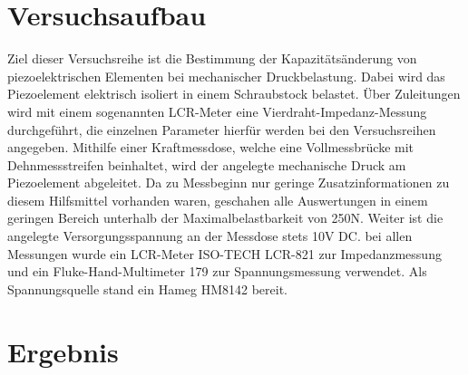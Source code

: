 \documentclass[12pt]{scrreprt} %
\begin{document}
\section{Versuchsaufbau}

Ziel dieser Versuchsreihe ist die Bestimmung der Kapazitätsänderung von piezoelektrischen Elementen bei mechanischer Druckbelastung. Dabei wird das Piezoelement elektrisch isoliert in einem Schraubstock belastet. Über Zuleitungen wird mit einem sogenannten LCR-Meter eine Vierdraht-Impedanz-Messung durchgeführt, die einzelnen Parameter hierfür werden bei den Versuchsreihen angegeben. Mithilfe einer Kraftmessdose, welche eine Vollmessbrücke mit Dehnmessstreifen beinhaltet, wird der angelegte mechanische Druck am Piezoelement abgeleitet. Da zu Messbeginn nur geringe Zusatzinformationen zu diesem Hilfsmittel vorhanden waren, geschahen alle Auswertungen in einem geringen Bereich unterhalb der Maximalbelastbarkeit von 250N. Weiter ist die angelegte Versorgungsspannung an der Messdose stets 10V DC. bei allen Messungen wurde ein LCR-Meter ISO-TECH LCR-821 zur Impedanzmessung und ein Fluke-Hand-Multimeter 179 zur Spannungsmessung verwendet. Als Spannungsquelle stand ein Hameg HM8142 bereit.

\section{Ergebnis}
\end{document}
